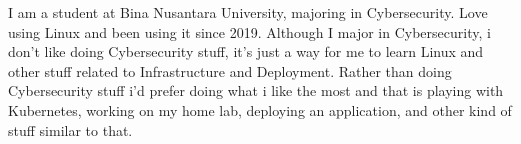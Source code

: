\documentclass[9pt]{developercv} %
\begin{document}
\begin{minipage}[t]{0.275\textwidth} %
	\vspace{-\baselineskip} %
	
	\\
	\\	
	\\
	\\
	\\
\end{minipage}

\vspace{0.5cm}



\begin{minipage}[t]{0.4\textwidth} %
	\vspace{-\baselineskip} %
	
  I am a student at Bina Nusantara University, majoring in Cybersecurity. Love
  using Linux and been using it since 2019. Although I major in Cybersecurity,
  i don’t like doing Cybersecurity stuff, it’s just a way for me to learn Linux
  and other stuff related to Infrastructure and Deployment. Rather than doing
  Cybersecurity stuff i’d prefer doing what i like the most and that is playing
  with Kubernetes, working on my home lab, deploying an application, and other
  kind of stuff similar to that.
\end{minipage}
\hfill %
\begin{minipage}[t]{0.5\textwidth} %
	\vspace{-\baselineskip} %
	\begin{barchart}{5.5}
	\end{barchart}
\end{minipage}
\end{document}
